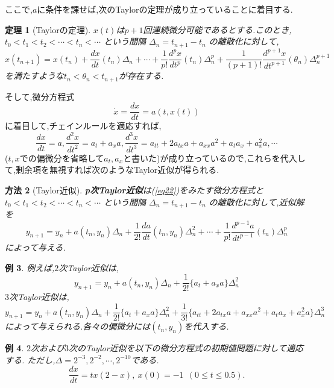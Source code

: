 \documentclass[a4paper,dvipdfmx]{jreport}
\numberwithin{equation}{section}
\newtheorem{Thm}     {定理}[section]
\newtheorem{Ex}      [Thm]{例}
\newtheorem{Method}[Thm]{方法}
\renewenvironment{leftbar}{%
  \def\FrameCommand{\vrule width 1pt \hspace{10pt}}%
  \MakeFramed {\advance\hsize-\width \FrameRestore}}%
 {\endMakeFramed}
\def\method{\begin{leftbar}\begin{Method}}
\def\methodx{\end{Method}\end{leftbar}}
\def\thm{\begin{leftbar}\begin{Thm}}
\def\thmx{\end{Thm}\end{leftbar}}
\def\ex{\begin{Ex}}
\def\exx{\end{Ex}}
\def\eq{\begin{equation}}
\def\eqx{\end{equation}}
\begin{document}
ここで,$a$に条件を課せば,次のTaylorの定理が成り立っていることに着目する.
\thm[Taylorの定理]
$x(t)$は$p+1$回連続微分可能であるとする.このとき,
$ t_0 < t_1 < t_2 < \cdots < t_n < \cdots $ という間隔 $\Delta_n = t_{n+1} - t_{n}$ の離散化に対して,
\eq
\label{eq21}
x(t_{n+1}) = x(t_n) + \frac{dx}{dt}(t_n)\Delta_n + \cdots + 
\frac{1}{p!}\frac{d^px}{dt^p}(t_n)\Delta^p_n + \frac{1}{(p+1)!}\frac{d^{p+1}x}{dt^{p+1}}(\theta_n)\Delta^{p+1}_n
\eqx
を満たすような$t_n < \theta_n < t_{n+1}$が存在する.
\thmx
そして,微分方程式
\eq
\label{eq22}
\dot{x} = \frac{dx}{dt} = a(t,x(t))
\eqx
に着目して,チェインルールを適応すれば,
\eq
\frac{dx}{dt} = a ,\frac{d^2x}{dt^2} = a_t + a_x a, 
\frac{d^3x}{dt^3} = a_{tt} + 2a_{tx}a + a_{xx}a^2 + a_ta_x +a_x^2 a, \cdots
\eqx
($t,x$での偏微分を省略して$a_t,a_x$と書いた)が成り立っているので,これらを代入して,剰余項を無視すれば次のようなTaylor近似が得られる.
\method[Taylor近似]
{\bf p次Taylor近似}は(\ref{eq22})をみたす微分方程式と$ t_0 < t_1 < t_2 < \cdots < t_n < \cdots $ という間隔 $\Delta_n = t_{n+1} - t_{n}$ の離散化に対して,近似解を
\eq
\label{eq23}
y_{n+1} = y_n + a(t_n,y_n)\Delta_n + \frac{1}{2!}\frac{da}{dt}(t_n,y_n) \Delta_n^2 + \cdots + \frac{1}{p!}\frac{d^{p-1}a}{dt^{p-1}}(t_n)\Delta^p_n
\eqx
によって与える.
\methodx
\ex
例えば,$2$次Taylor近似は,
\eq
y_{n+1} = y_n + a(t_n,y_n)\Delta_n + \frac{1}{2!}\{ a_t + a_x a \} \Delta_n^2
\eqx
$3$次Taylor近似は,
\eq
y_{n+1} = y_n + a(t_n,y_n)\Delta_n + \frac{1}{2!}\{ a_t + a_x a \} \Delta_n^2
+\frac{1}{3!}\{ a_{tt} + 2a_{tx}a + a_{xx}a^2 + a_ta_x +a_x^2 a \} \Delta_n^3
\eqx
によって与えられる.各々の偏微分には$(t_n,y_n)$を代入する.
\exx
\ex
$2$次および$3$次のTaylor近似を以下の微分方程式の初期値問題に対して適応する.
ただし,$\Delta = 2^{-3},2^{-2},\cdots,2^{-10}$である.
\[
\frac{dx}{dt} = tx(2-x) , \  x(0) = -1\ \  (0 \le t \le 0.5). 
\]
\exx
{\par%
\vspace{-1\baselineskip}%
}%
\end{document}
